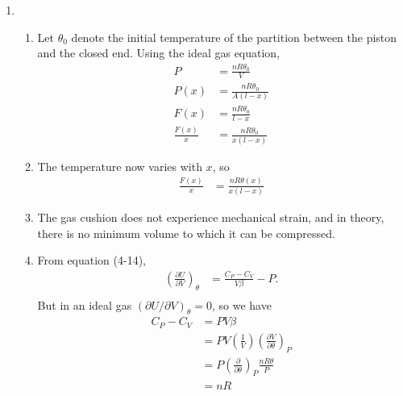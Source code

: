 \documentclass[a4paper,12pt]{article}
\begin{document}
\begin{enumerate}
    \item
        \begin{enumerate}
            \item
                Let $\theta_0$ denote the initial temperature of the partition between the piston and the closed end. Using the ideal gas equation,
                \begin{align*}
                    P &= \frac{nR \theta_0}{V} \\
                    P(x) &= \frac{nR \theta_0}{A(l - x)} \\
                    F(x) &= \frac{nR \theta_0}{l - x} \\
                    \frac{F(x)}{x} &= \frac{nR \theta_0}{x(l - x)}
                \end{align*}

            \item
                The temperature now varies with $x$, so
                \begin{align*}
                    \frac{F(x)}{x} &= \frac{nR \theta(x)}{x(l - x)}
                \end{align*}

            \item
                The gas cushion does not experience mechanical strain, and in theory, there is no minimum volume to which it can be compressed.

            \item
                From equation (4-14),
                \begin{align*}
                    \left( \frac{\partial U}{\partial V} \right)_\theta &= \frac{C_P - C_V}{V \beta} - P. \\
                \end{align*}
                But in an ideal gas $(\partial U / \partial V)_\theta = 0$, so we have
                \begin{align*}
                    C_P - C_V &= PV \beta \\
                    &= PV \left( \frac{1}{V} \right) \left( \frac{\partial V}{\partial \theta} \right)_P \\
                    &= P \left( \frac{\partial}{\partial \theta} \right)_P \frac{nR \theta}{P} \\
                    &= nR
                \end{align*}
        \end{enumerate}
\end{enumerate}
\end{document}
